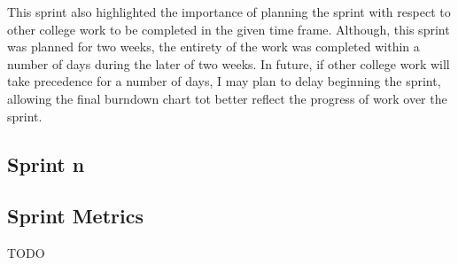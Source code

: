 		This sprint also highlighted the importance of planning the sprint with respect to other college work to be completed in the given time frame. Although, this sprint was planned for two weeks, the entirety of the work was completed within a number of days during the later of two weeks. In future, if other college work will take precedence for a number of days, I may plan to delay beginning the sprint, allowing the final burndown chart tot better reflect the progress of work over the sprint.

	\subsection{Sprint n}

	\subsection{Sprint Metrics}
	TODO

	